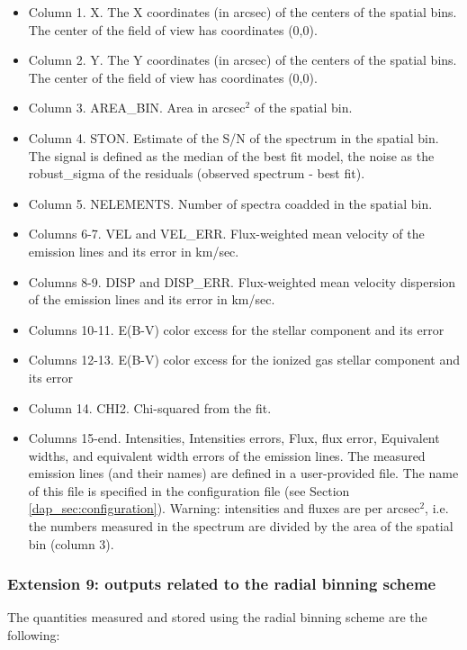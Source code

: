 \begin{itemize}

\item Column 1. X. The X coordinates (in arcsec) of the centers of the spatial bins. The center of the field of view has coordinates (0,0).
\item Column 2. Y. The Y coordinates (in arcsec) of the centers of the spatial bins. The center of the field of view has coordinates (0,0).
\item Column 3. AREA\_BIN. Area in arcsec$^2$ of the spatial bin.
\item Column 4. STON. Estimate of the S/N of the spectrum in the
  spatial bin. The signal is defined as the median of the best fit
  model, the noise as the robust\_sigma of the residuals (observed
  spectrum - best fit).
\item Column 5. NELEMENTS. Number of spectra coadded in the spatial bin.
\item Columns 6-7. VEL and VEL\_ERR. Flux-weighted mean velocity of the emission lines and its error in km/sec.
\item Columns 8-9. DISP and DISP\_ERR. Flux-weighted mean velocity dispersion of the emission lines and its error in km/sec.
\item Columns 10-11. E(B-V) color excess for the stellar component and its error
\item Columns 12-13. E(B-V) color excess for the ionized gas stellar component and its error
\item Column 14.  CHI2. Chi-squared from the fit.
\item Columns 15-end. Intensities, Intensities errors, Flux, flux error, Equivalent widths, and
  equivalent width errors of the emission lines.  The measured
  emission lines (and their names) are defined in a user-provided
  file. The name of this file is specified in the configuration file
  (see Section \ref{dap_sec:configuration}). Warning: intensities and fluxes are per arcsec$^2$, i.e. the numbers measured in the spectrum are divided by the area of the spatial bin (column 3).
\end{itemize}

\subsubsection{Extension 9: outputs related to the radial binning
  scheme} 


The quantities measured and stored using the radial binning scheme are
the following:

